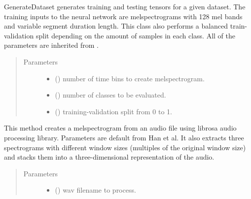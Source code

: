 \documentclass[letterpaper,10pt,english]{sphinxmanual}
\begin{document}
\begin{fulllineitems}
\label{\detokenize{generate_dataset:generate_dataset.GenerateDataset}}
GenerateDataset generates training and testing tensors for a given dataset.
The training inputs to the neural network are melspectrograms with 128 
mel bands and variable segment duration length. This class also performs a 
balanced train-validation split depending on the amount of samples in each
class. All of the parameters are inherited from .
\begin{quote}\begin{description}
\item[{Parameters}] \leavevmode\begin{itemize}
\item {} 
 () \textendash{} number of time bins to create melspectrogram.

\item {} 
 () \textendash{} number of classes to be evaluated.

\item {} 
 () \textendash{} training-validation split from 0 to 1.

\end{itemize}

\end{description}\end{quote}

\begin{fulllineitems}
\label{\detokenize{generate_dataset:generate_dataset.GenerateDataset.create_multi_spectrogram}}
This method creates a melspectrogram from an audio file using librosa
audio processing library. Parameters are default from Han et al. It also 
extracts three spectrograms with different window sizes (multiples of the 
original window size) and stacks them into a three-dimensional representation 
of the audio.
\begin{quote}\begin{description}
\item[{Parameters}] \leavevmode\begin{itemize}
\item {} 
 () \textendash{} wav filename to process.


\end{itemize}
\end{description}
\end{quote}
\end{fulllineitems}
\end{fulllineitems}
\end{document}
